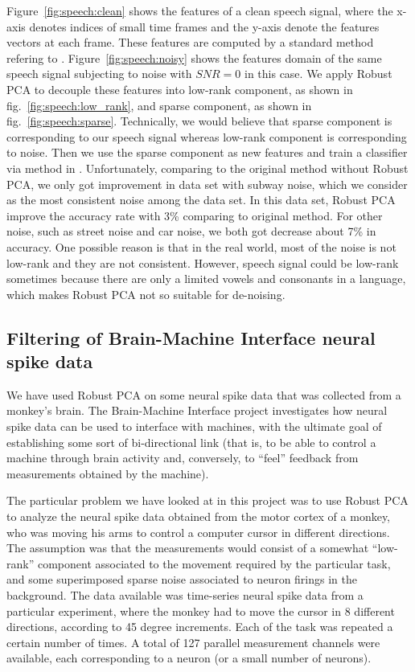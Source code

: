 \documentclass{../../common/projectreport}
\begin{document}
Figure~\ref{fig:speech:clean} shows the features of a clean speech signal, where the x-axis denotes indices of small time frames and the y-axis denote the features vectors at each frame. These features are computed by a standard method refering to \cite{}. Figure~\ref{fig:speech:noisy} shows the features domain of the same speech signal subjecting to noise with $SNR = 0$ in this case. We apply Robust PCA to decouple these features into low-rank component, as shown in fig.~\ref{fig:speech:low_rank}, and sparse component, as shown in fig.~\ref{fig:speech:sparse}. Technically, we would believe that sparse component is corresponding to our speech signal whereas low-rank component is corresponding to noise. Then we use the sparse component as new features and train a classifier via method in \cite{}. Unfortunately, comparing to the original method without  Robust PCA, we only got improvement in data set with subway noise, which we consider as the most consistent noise among the data set. In this data set, Robust PCA improve the accuracy rate with 3\% comparing to original method. For other noise, such as street noise and car noise, we both got decrease about 7\% in accuracy. One possible reason is that in the real world, most of the noise is not low-rank and they are not consistent. However, speech signal could be low-rank sometimes because there are only a limited vowels and consonants in a language, which makes Robust PCA not so suitable for de-noising.  



\subsection{Filtering of Brain-Machine Interface neural spike data}

We have used Robust PCA on some neural spike data that was collected from a monkey's brain. The Brain-Machine Interface project investigates how neural spike data can be used to interface with machines, with the ultimate goal of establishing some sort of bi-directional link (that is, to be able to control a machine through brain activity and, conversely, to ``feel'' feedback from measurements obtained by the machine). 

The particular problem we have looked at in this project was to use Robust PCA to analyze the neural spike data obtained from the motor cortex of a monkey, who was moving his arms to control a computer cursor in different directions. The assumption was that the measurements would consist of a somewhat ``low-rank'' component associated to the movement required by the particular task, and some superimposed sparse noise associated to neuron firings in the background. The data available was time-series neural spike data from a particular experiment, where the monkey had to move the cursor in 8 different directions, according to 45 degree increments. Each of the task was repeated a certain number of times. A total of 127 parallel measurement channels were available, each corresponding to a neuron (or a small number of neurons). 
\end{document}
